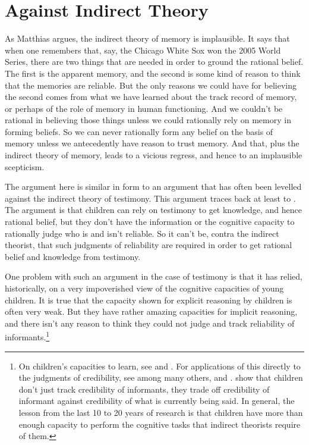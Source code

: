 \section{Against Indirect Theory}
\label{againstindirecttheory}

As Matthias  \citet{Steup2013} argues, the indirect theory of memory is implausible. It says that when one remembers that, say, the Chicago White Sox won the 2005 World Series, there are two things that are needed in order to ground the rational belief. The first is the apparent memory, and the second is some kind of reason to think that the memories are reliable. But the only reasons we could have for believing the second comes from what we have learned about the track record of memory, or perhaps of the role of memory in human functioning. And we couldn't be rational in believing those things unless we could rationally rely on memory in forming beliefs. So we can never rationally form any belief on the basis of memory unless we antecedently have reason to trust memory. And that, plus the indirect theory of memory, leads to a vicious regress, and hence to an implausible scepticism.

The argument here is similar in form to an argument that has often been levelled against the indirect theory of testimony. This argument traces back at least to  \citet{Coady1995}. The argument is that children can rely on testimony to get knowledge, and hence rational belief, but they don't have the information or the cognitive capacity to rationally judge who is and isn't reliable. So it can't be, contra the indirect theorist, that such judgments of reliability are required in order to get rational belief and knowledge from testimony.

One problem with such an argument in the case of testimony is that it has relied, historically, on a very impoverished view of the cognitive capacities of young children. It is true that the capacity shown for explicit reasoning by children is often very weak. But they have rather amazing capacities for implicit reasoning, and there isn't any reason to think they could not judge and track reliability of informants.\footnote{On children's capacities to learn, see  \citet{Saffran1996b, Saffran1996a} and  \citet{Gopnik2001}. For applications of this directly to the judgments of credibility, see among many others,  \citet{KoenigClementHarris2004} and  \citet{HarrisCorriveau2011}.  \citet{Jaswal2008} show that children don't just track credibility of informants, they trade off credibility of informant against credibility of what is currently being said. In general, the lesson from the last 10 to 20 years of research is that children have more than enough capacity to perform the cognitive tasks that indirect theorists require of them.}

